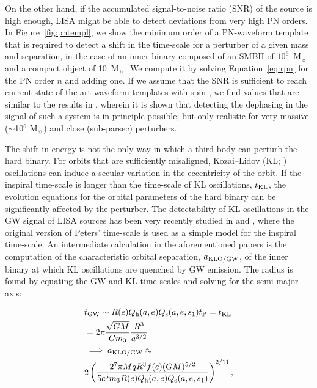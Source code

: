\documentclass[usenatbib]{mnras}
\begin{document}
On the other hand, if the accumulated signal-to-noise ratio (SNR) of the source is high enough, LISA might be able to detect deviations from very high PN orders. In Figure~\ref{fig:pntempl}, we show the minimum order of a PN-waveform template that is required to detect a shift in the time-scale for a perturber of a given mass and separation, in the case of an inner binary composed of an SMBH of $10^6$~M$_{\sun}$ and a compact object of 10~M$_{\sun}$. We compute it by solving Equation~\eqref{eq:rpn} for the PN order $n$ and adding one. If we assume that the SNR is sufficient to reach current state-of-the-art waveform templates with spin \citep[depicted in Figure~\ref{fig:pntempl};][]{2015PTEP.2015c3E01F}, we find values that are similar to the results in \cite{PhysRevD.83.044030}, wherein it is shown that detecting the dephasing in the signal of such a system is in principle possible, but only realistic for very massive ($\sim$10$^6$ M$_{\sun}$) and close (sub-parsec) perturbers.

The shift in energy is not the only way in which a third body can perturb the hard binary. For orbits that are sufficiently misaligned, Kozai--Lidov (KL; \citealt{Kozai,Lidov}) oscillations can induce a secular variation in the eccentricity of the orbit. If the inspiral time-scale is longer than the time-scale of KL oscillations, $t_{\rm{KL}}$, the evolution equations for the orbital parameters of the hard binary can be significantly affected by the perturber. The detectability of KL oscillations in the GW signal of LISA sources has been very recently studied in \cite{2019arXiv190208604R} and \cite{2020ApJ...901..125D}, where the original version of Peters' time-scale is used as a simple model for the inspiral time-scale. An intermediate calculation in the aforementioned papers is the computation of the characteristic orbital separation, $a_{\rm{KLO/GW}}$, of the inner binary at which KL oscillations are quenched by GW emission. The radius is found by equating the GW and KL time-scales and solving for the semi-major axis:

\begin{align}
     &t_{\rm{GW}} \sim R(e) Q_{\rm{h}}(a,e)Q_{\rm{s}}(a,e,s_1) t_{\rm P} \nonumber
     = t_{\rm{KL}} \\ &= 2 \pi \frac{\sqrt{G M}}{G m_3}\frac{R^3}{a^{3/2}} \\
     &\implies a_{\rm{KLO/GW}} \approx \nonumber\\ & 2 \left(\frac{2^7 \pi M q R^3 f(e) (G M)^{5/2}}{5c^5 m_3
   R(e) Q_{\rm{h}}(a,e)Q_{\rm{s}}(a,e,s_1)}\right)^{2/11},\\ \nonumber
\end{align}
\end{document}
